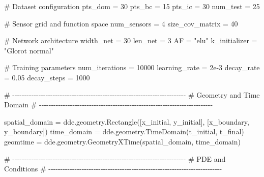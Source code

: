 \documentclass[
  spanish,
  us-letterpaper,
  DIV=11,
  numbers=noendperiod]{scrreprt}
\newenvironment{Shaded}{\begin{snugshade}}{\end{snugshade}}
\newcommand{\CommentTok}[1]{\textcolor[rgb]{0.37,0.37,0.37}{#1}}
\newcommand{\DecValTok}[1]{\textcolor[rgb]{0.68,0.00,0.00}{#1}}
\newcommand{\FloatTok}[1]{\textcolor[rgb]{0.68,0.00,0.00}{#1}}
\newcommand{\NormalTok}[1]{\textcolor[rgb]{0.00,0.23,0.31}{#1}}
\newcommand{\OperatorTok}[1]{\textcolor[rgb]{0.37,0.37,0.37}{#1}}
\newcommand{\StringTok}[1]{\textcolor[rgb]{0.13,0.47,0.30}{#1}}
\theoremstyle{plain}
\theoremstyle{definition}
\theoremstyle{remark}
\begin{document}
\begin{Shaded}
\begin{Highlighting}[]
\CommentTok{\# Dataset configuration}
\NormalTok{pts\_dom }\OperatorTok{=} \DecValTok{30}
\NormalTok{pts\_bc }\OperatorTok{=} \DecValTok{15}
\NormalTok{pts\_ic }\OperatorTok{=} \DecValTok{30}
\NormalTok{num\_test }\OperatorTok{=} \DecValTok{25}

\CommentTok{\# Sensor grid and function space}
\NormalTok{num\_sensors }\OperatorTok{=} \DecValTok{4}
\NormalTok{size\_cov\_matrix }\OperatorTok{=} \DecValTok{40}

\CommentTok{\# Network architecture}
\NormalTok{width\_net }\OperatorTok{=} \DecValTok{30}
\NormalTok{len\_net }\OperatorTok{=} \DecValTok{3}
\NormalTok{AF }\OperatorTok{=} \StringTok{"elu"}
\NormalTok{k\_initializer }\OperatorTok{=} \StringTok{"Glorot normal"}

\CommentTok{\# Training parameters}
\NormalTok{num\_iterations }\OperatorTok{=} \DecValTok{10000}
\NormalTok{learning\_rate }\OperatorTok{=} \FloatTok{2e{-}3}
\NormalTok{decay\_rate }\OperatorTok{=} \FloatTok{0.05}
\NormalTok{decay\_steps }\OperatorTok{=} \DecValTok{1000}

\CommentTok{\# {-}{-}{-}{-}{-}{-}{-}{-}{-}{-}{-}{-}{-}{-}{-}{-}{-}{-}{-}{-}{-}{-}{-}{-}{-}{-}{-}{-}{-}{-}{-}{-}{-}{-}{-}{-}{-}{-}{-}{-}{-}{-}{-}{-}{-}{-}{-}{-}{-}{-}{-}{-}{-}{-}{-}{-}{-}{-}{-}{-}{-}{-}{-}{-}{-}{-}{-}{-}{-}{-}{-}{-}{-}}
\CommentTok{\# Geometry and Time Domain}
\CommentTok{\# {-}{-}{-}{-}{-}{-}{-}{-}{-}{-}{-}{-}{-}{-}{-}{-}{-}{-}{-}{-}{-}{-}{-}{-}{-}{-}{-}{-}{-}{-}{-}{-}{-}{-}{-}{-}{-}{-}{-}{-}{-}{-}{-}{-}{-}{-}{-}{-}{-}{-}{-}{-}{-}{-}{-}{-}{-}{-}{-}{-}{-}{-}{-}{-}{-}{-}{-}{-}{-}{-}{-}{-}{-}}

\NormalTok{spatial\_domain }\OperatorTok{=}\NormalTok{ dde.geometry.Rectangle([x\_initial, y\_initial],}
\NormalTok{                                        [x\_boundary, y\_boundary])}
\NormalTok{time\_domain }\OperatorTok{=}\NormalTok{ dde.geometry.TimeDomain(t\_initial, t\_final)}
\NormalTok{geomtime }\OperatorTok{=}\NormalTok{ dde.geometry.GeometryXTime(spatial\_domain, time\_domain)}

\CommentTok{\# {-}{-}{-}{-}{-}{-}{-}{-}{-}{-}{-}{-}{-}{-}{-}{-}{-}{-}{-}{-}{-}{-}{-}{-}{-}{-}{-}{-}{-}{-}{-}{-}{-}{-}{-}{-}{-}{-}{-}{-}{-}{-}{-}{-}{-}{-}{-}{-}{-}{-}{-}{-}{-}{-}{-}{-}{-}{-}{-}{-}{-}{-}{-}{-}{-}{-}{-}{-}{-}{-}{-}{-}{-}}
\CommentTok{\# PDE and Conditions}
\CommentTok{\# {-}{-}{-}{-}{-}{-}{-}{-}{-}{-}{-}{-}{-}{-}{-}{-}{-}{-}{-}{-}{-}{-}{-}{-}{-}{-}{-}{-}{-}{-}{-}{-}{-}{-}{-}{-}{-}{-}{-}{-}{-}{-}{-}{-}{-}{-}{-}{-}{-}{-}{-}{-}{-}{-}{-}{-}{-}{-}{-}{-}{-}{-}{-}{-}{-}{-}{-}{-}{-}{-}{-}{-}{-}}


\end{Highlighting}
\end{Shaded}
\end{document}
